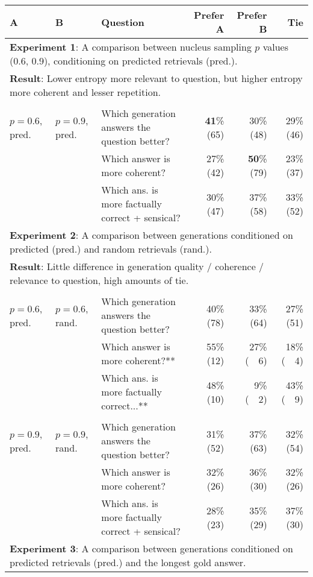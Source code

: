 \documentclass[11pt]{article}
\begin{document}
\begin{table*}[t]
\small
\begin{center}
\begin{tabular}{ lllrrr } 
 \toprule
A & B & Question &  Prefer A & Prefer B & Tie \\
\midrule
\multicolumn{6}{l}{\textbf{Experiment 1}: A comparison between nucleus sampling $p$ values (0.6, 0.9), conditioning on predicted retrievals (pred.).} \\
\multicolumn{6}{l}{\textbf{Result}: Lower entropy more relevant to question, but higher entropy more coherent and lesser repetition.}\\\\
 $p=0.6$, pred. & $p=0.9$, pred. & Which generation answers the question better? & \textbf{41}\% (65) & 30\% (48) & 29\% (46) \\
 & & Which answer is more coherent? & 27\% (42) & \textbf{50}\% (79) & 23\% (37) \\
& & Which ans. is more factually correct + sensical? & 30\% (47) & 37\% (58) & 33\% (52)\\
\midrule
\multicolumn{6}{l}{\textbf{Experiment 2}: A comparison between generations conditioned on predicted (pred.) and random retrievals (rand.).} \\
\multicolumn{6}{l}{\textbf{Result}: Little difference in generation quality / coherence / relevance to question, high amounts of tie.}\\\\
 $p=0.6$, pred. & $p=0.6$, rand. & Which generation answers the question better? & 40\% (78) & 33\% (64) & 27\% (51) \\
  & & Which answer is more coherent?** & 55\% (12) & 27\% (~~6) & 18\% (~~4) \\
  & & Which ans. is more factually correct...** & 48\% (10) & 9\% (~~2) & 43\% (~~9) \\\\
 $p=0.9$, pred. & $p=0.9$, rand. & Which generation answers the question better? & 31\% (52) & 37\% (63) & 32\% (54)\\
  & & Which answer is more coherent? & 32\% (26) & 36\% (30) & 32\% (26) \\
  & & Which ans. is more factually correct + sensical? & 28\% (23) & 35\% (29) & 37\% (30) \\
 \midrule
 \multicolumn{6}{l}{\textbf{Experiment 3}: A comparison between generations conditioned on predicted retrievals (pred.) and the longest gold answer.} \\

\end{tabular}
\end{center}
\end{table*}
\end{document}
